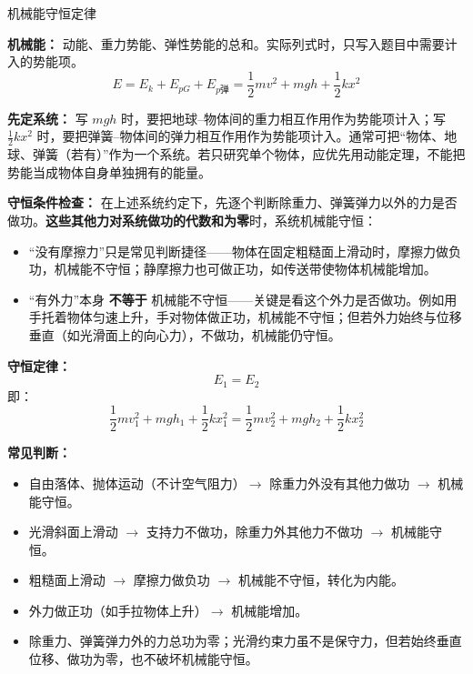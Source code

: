 \begin{conceptbox}{机械能守恒定律}

\textbf{机械能：} 动能、重力势能、弹性势能的总和。实际列式时，只写入题目中需要计入的势能项。
\[
E = E_k + E_{pG} + E_{p\text{弹}} = \frac12 mv^2 + mgh + \frac12 kx^2
\]

\textbf{先定系统：} 写 $mgh$ 时，要把地球--物体间的重力相互作用作为势能项计入；写 $\frac12kx^2$ 时，要把弹簧--物体间的弹力相互作用作为势能项计入。通常可把“物体、地球、弹簧（若有）”作为一个系统。若只研究单个物体，应优先用动能定理，不能把势能当成物体自身单独拥有的能量。

\textbf{守恒条件检查：} 在上述系统约定下，先逐个判断除重力、弹簧弹力以外的力是否做功。\textbf{这些其他力对系统做功的代数和为零}时，系统机械能守恒：
\begin{itemize}
  \item “没有摩擦力”只是常见判断捷径——物体在固定粗糙面上滑动时，摩擦力做负功，机械能不守恒；静摩擦力也可做正功，如传送带使物体机械能增加。
  \item “有外力”本身 \textbf{不等于} 机械能不守恒——关键是看这个外力是否做功。例如用手托着物体匀速上升，手对物体做正功，机械能不守恒；但若外力始终与位移垂直（如光滑面上的向心力），不做功，机械能仍守恒。
\end{itemize}

\textbf{守恒定律：}
\[
\boxed{E_1 = E_2}
\]
即：
\[
\frac12 mv_1^2 + mgh_1 + \frac12 kx_1^2 = \frac12 mv_2^2 + mgh_2 + \frac12 kx_2^2
\]

\begin{center}


\label{fig:energy-conservation}
\end{center}

\textbf{常见判断：}
\begin{itemize}
  \item 自由落体、抛体运动（不计空气阻力）$\to$ 除重力外没有其他力做功 $\to$ 机械能守恒。
  \item 光滑斜面上滑动 $\to$ 支持力不做功，除重力外其他力不做功 $\to$ 机械能守恒。
  \item 粗糙面上滑动 $\to$ 摩擦力做负功 $\to$ 机械能不守恒，转化为内能。
  \item 外力做正功（如手拉物体上升）$\to$ 机械能增加。
  \item 除重力、弹簧弹力外的力总功为零；光滑约束力虽不是保守力，但若始终垂直位移、做功为零，也不破坏机械能守恒。
\end{itemize}
\nopagebreak[3]

\end{conceptbox}

